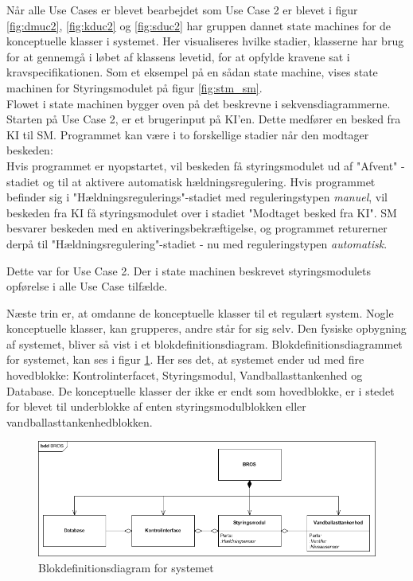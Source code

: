 Når alle Use Cases er blevet bearbejdet som Use Case 2 er blevet i figur \ref{fig:dmuc2}, \ref{fig:kduc2} og \ref{fig:sduc2} har gruppen dannet state machines for de konceptuelle klasser i systemet. Her visualiseres hvilke stadier, klasserne har brug for at gennemgå i løbet af klassens levetid, for at opfylde kravene sat i kravspecifikationen. Som et eksempel på en sådan state machine, vises state machinen for Styringsmodulet på figur \ref{fig:stm_sm}. \\Flowet i state machinen bygger oven på det beskrevne i sekvensdiagrammerne. Starten på Use Case 2, er et brugerinput på KI'en. Dette medfører en besked fra KI til SM. Programmet kan være i to forskellige stadier når den modtager beskeden:\\
Hvis programmet er nyopstartet, vil beskeden få styringsmodulet ud af "Afvent" -stadiet og til at aktivere automatisk hældningsregulering. Hvis programmet befinder sig i "Hældningsregulerings"-stadiet med reguleringstypen \textit{manuel}, vil beskeden fra KI få styringsmodulet over i stadiet "Modtaget besked fra KI". SM besvarer beskeden med en aktiveringsbekræftigelse, og programmet returerner derpå til "Hældningsregulering"-stadiet - nu med reguleringstypen \textit{automatisk}.

Dette var for Use Case 2. Der i state machinen beskrevet styringsmodulets opførelse i alle Use Case tilfælde. 

Næste trin er, at omdanne de konceptuelle klasser til et regulært system. Nogle konceptuelle klasser, kan grupperes, andre står for sig selv. Den fysiske opbygning af systemet, bliver så vist i et blokdefinitionsdiagram. Blokdefinitionsdiagrammet for 
systemet, kan ses i figur \ref{fig:bdd_bros}. Her ses det, at systemet ender ud med fire hovedblokke: Kontrolinterfacet, Styringsmodul, Vandballasttankenhed og Database. De konceptuelle klasser der ikke er endt som hovedblokke, er i stedet for blevet til underblokke af enten styringsmodulblokken eller vandballasttankenhedblokken.

\begin{figure}[htbp]
\centering
\includegraphics[scale=0.8]{billeder/Systemarkitektur/bdd_bros}
\caption{Blokdefinitionsdiagram for systemet}
\label{fig:bdd_bros}
\end{figure}

